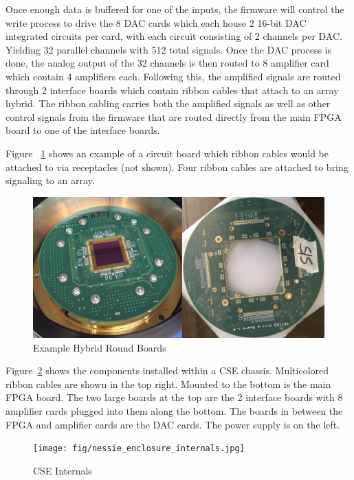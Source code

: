     Once enough data is buffered for one of the inputs, the firmware will control the write process to drive the 8 DAC cards which each house 2 16-bit DAC integrated circuits per card, with each circuit consisting of 2 channels per DAC. Yielding 32 parallel channels with 512 total signals. Once the DAC process is done, the analog output of the 32 channels is then routed to 8 amplifier card which contain 4 amplifiers each. Following this, the amplified signals are routed through 2 interface boards which contain ribbon cables that attach to an array hybrid. The ribbon cabling carries both the amplified signals as well as other control signals from the firmware that are routed directly from the main FPGA board to one of the interface boards.

    Figure ~\ref{fig:round_board} shows an example of a circuit board which ribbon cables would be attached to via receptacles (not shown). Four ribbon cables are attached to bring signaling to an array.

    \begin{figure}
        \centering
        \includegraphics[width=1.0\textwidth]{fig/round_board.jpg}
        \caption{Example Hybrid Round Boards}
        \label{fig:round_board}
    \end{figure}

    Figure~\ref{fig:nessie_enclosure_internals} shows the components installed within a CSE chassis. Multicolored ribbon cables are shown in the top right. Mounted to the bottom is the main FPGA board. The two large boards at the top are the 2 interface boards with 8 amplifier cards plugged into them along the bottom. The boards in between the FPGA and amplifier cards are the DAC cards. The power supply is on the left.

    \begin{figure}
        \centering
        \texttt{[image: fig/nessie\_enclosure\_internals.jpg]}
        \caption{CSE Internals}
        \label{fig:nessie_enclosure_internals}
    \end{figure}

